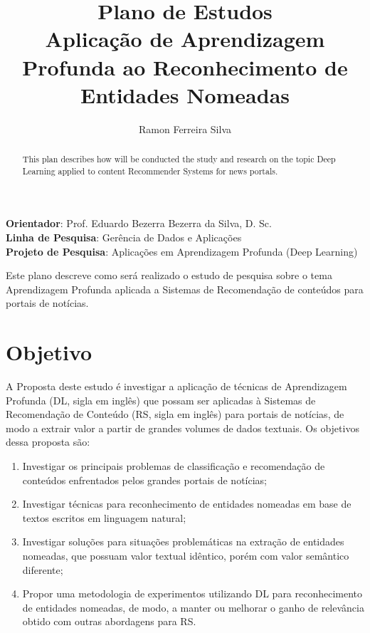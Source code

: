 \documentclass[12pt]{article}
\title{Plano de Estudos \\ Aplicação de Aprendizagem Profunda ao Reconhecimento de Entidades Nomeadas}
\author[1]{Ramon Ferreira Silva}
\begin{document}
\maketitle

\begin{flushleft}
\textbf{Orientador}: Prof. Eduardo Bezerra Bezerra da Silva, D. Sc. \hfill{}\\
\textbf{Linha de Pesquisa}: Gerência de Dados e Aplicações \hfill{}\\
\textbf{Projeto de Pesquisa}: Aplicações em Aprendizagem Profunda (Deep Learning) \hfill{}\\
\end{flushleft}


\begin{abstract}
This plan describes how will be conducted the study and research on the topic Deep Learning applied to content Recommender Systems for news portals.
\end{abstract}
     
\begin{resumo} 
  Este plano descreve como será realizado o estudo de pesquisa sobre o tema Aprendizagem Profunda aplicada a Sistemas de Recomendação de conteúdos para portais de notícias.
\end{resumo}


\section{Objetivo}
A Proposta deste estudo é investigar a aplicação de técnicas de  Aprendizagem Profunda (DL, sigla em inglês) que possam ser aplicadas à Sistemas de Recomendação de Conteúdo (RS, sigla em inglês) para portais de notícias, de modo a extrair valor a partir de grandes volumes de dados textuais. Os objetivos dessa proposta são:

\begin{enumerate}
\item Investigar os principais problemas de classificação e recomendação de conteúdos enfrentados pelos grandes portais de notícias;

\item Investigar técnicas para reconhecimento de entidades nomeadas em base de textos escritos em linguagem natural;

\item Investigar soluções para situações problemáticas na extração de entidades nomeadas, que possuam valor textual idêntico, porém com valor semântico diferente;

\item Propor uma metodologia de experimentos utilizando DL para reconhecimento de entidades nomeadas, de modo,  a manter ou melhorar o ganho de relevância obtido com outras abordagens para RS.
 
\end{enumerate}
\end{document}
